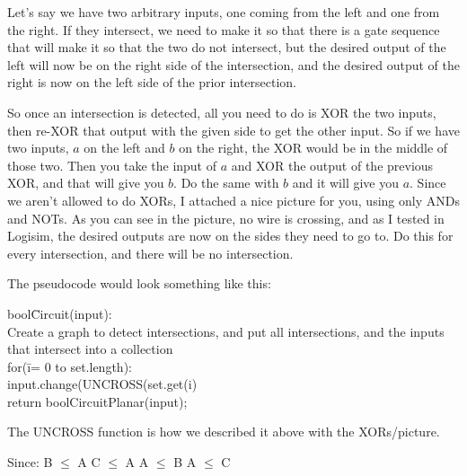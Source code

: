 \documentclass{article}
\begin{document}
\begin{enumerate}
Let's say we have two arbitrary inputs, one coming from the left and one from the right. If they intersect, we need to make it so that there is a gate sequence that will make it so that the two do not intersect, but the desired output of the left will now be on the right side of the intersection, and the desired output of the right is now on the left side of the prior intersection.

So once an intersection is detected, all you need to do is XOR the two inputs, then re-XOR that output with the given side to get the other input. So if we have two inputs, $a$ on the left and $b$ on the right, the XOR would be in the middle of those two. Then you take the input of $a$ and XOR the output of the previous XOR, and that will give you $b$. Do the same with $b$ and it will give you $a$. Since we aren't allowed to do XORs, I attached a nice picture for you, using only ANDs and NOTs. As you can see in the picture, no wire is crossing, and as I tested in Logisim, the desired outputs are now on the sides they need to go to. Do this for every intersection, and there will be no intersection.

The pseudocode would look something like this:
\begin{tabbing}
bool\=Circuit(input):\\
\>Create a graph to detect intersections, and put all intersections, and the inputs that intersect into a collection\\
\>for(\=i= 0 to set.length):\\
\>\>input.change(UNCROSS(set.get(i)\\
\>return boolCircuitPlanar(input);\\
\end{tabbing}
The UNCROSS function is how we described it above with the XORs/picture.

Since:
B $\le$ A \newline
C $\le$ A \newline
A $\le$ B \newline
A $\le$ C \newline


\end{enumerate}
\end{document}
